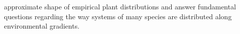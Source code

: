 \documentclass[11pt, a4paper]{article}
\begin{document}
approximate shape of empirical plant distributions and answer fundamental questions regarding the way systems of many species are distributed along environmental gradients.







\end{document}
